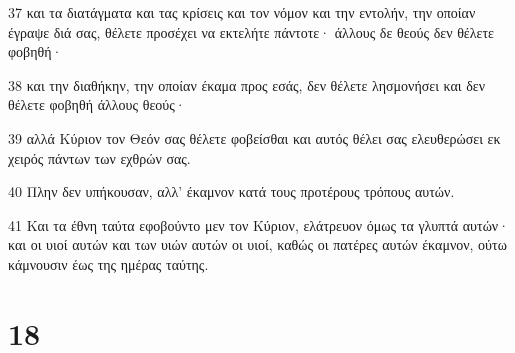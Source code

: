 \par 37 και τα διατάγματα και τας κρίσεις και τον νόμον και την εντολήν, την οποίαν έγραψε διά σας, θέλετε προσέχει να εκτελήτε πάντοτε· άλλους δε θεούς δεν θέλετε φοβηθή·
\par 38 και την διαθήκην, την οποίαν έκαμα προς εσάς, δεν θέλετε λησμονήσει και δεν θέλετε φοβηθή άλλους θεούς·
\par 39 αλλά Κύριον τον Θεόν σας θέλετε φοβείσθαι και αυτός θέλει σας ελευθερώσει εκ χειρός πάντων των εχθρών σας.
\par 40 Πλην δεν υπήκουσαν, αλλ' έκαμνον κατά τους προτέρους τρόπους αυτών.
\par 41 Και τα έθνη ταύτα εφοβούντο μεν τον Κύριον, ελάτρευον όμως τα γλυπτά αυτών· και οι υιοί αυτών και των υιών αυτών οι υιοί, καθώς οι πατέρες αυτών έκαμνον, ούτω κάμνουσιν έως της ημέρας ταύτης.

\chapter{18}

